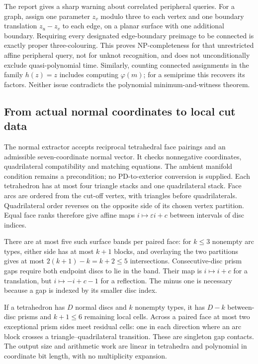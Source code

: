 The report gives a sharp warning about correlated peripheral queries.
For a graph, assign one parameter $z_v$ modulo three to each vertex and
one boundary translation $z_u-z_v$ to each edge, on a planar surface with
one additional boundary. Requiring every designated edge-boundary preimage
to be connected is exactly proper three-colouring. This proves NP-completeness
for that unrestricted affine peripheral query, not for unknot recognition,
and does not unconditionally exclude quasi-polynomial time. Similarly,
counting connected assignments in the family $h(z)=z$ includes computing
$\varphi(m)$; for a semiprime this recovers its factors. Neither issue
contradicts the polynomial minimum-and-witness theorem.

\subsection{From actual normal coordinates to local cut data}

The normal extractor accepts reciprocal tetrahedral face pairings and an
admissible seven-coordinate normal vector. It checks nonnegative coordinates,
quadrilateral compatibility and matching equations. The ambient manifold
condition remains a precondition; no PD-to-exterior conversion is supplied.
Each tetrahedron has at most four triangle stacks and one quadrilateral
stack. Face arcs are ordered from the cut-off vertex, with triangles before
quadrilaterals. Quadrilateral order reverses on the opposite side of its
chosen vertex partition. Equal face ranks therefore give affine maps
$i\mapsto\varepsilon i+c$ between intervals of disc indices.

There are at most five such surface bands per paired face: for $k\le3$
nonempty arc types, either side has at most $k+1$ blocks, and overlaying
the two partitions gives at most $2(k+1)-k=k+2\le5$ intersections.
Consecutive-disc prism gaps require both endpoint discs to lie in the band.
Their map is $i\mapsto i+c$ for a translation, but
$i\mapsto-i+c-1$ for a reflection. The minus one is necessary because a
gap is indexed by its smaller disc index.

If a tetrahedron has $D$ normal discs and $k$ nonempty types, it has
$D-k$ between-disc prisms and $k+1\le6$ remaining local cells. Across a
paired face at most two exceptional prism sides meet residual cells: one
in each direction where an arc block crosses a triangle--quadrilateral
transition. These are singleton gap contacts. The output size and arithmetic
work are linear in tetrahedra and polynomial in coordinate bit length,
with no multiplicity expansion.

